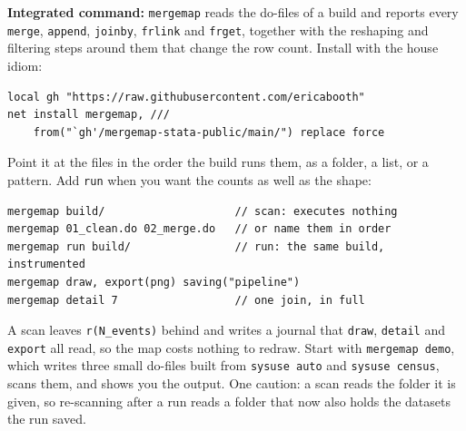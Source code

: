 \begin{kaobox}[frametitle=Package Integration: \texttt{mergemap}]
\textbf{Integrated command:} \texttt{mergemap} reads the do-files of a build and reports every \texttt{merge}, \texttt{append}, \texttt{joinby}, \texttt{frlink} and \texttt{frget}, together with the reshaping and filtering steps around them that change the row count. Install with the house idiom:
\par
{\footnotesize
\begin{verbatim}
local gh "https://raw.githubusercontent.com/ericabooth"
net install mergemap, ///
    from("`gh'/mergemap-stata-public/main/") replace force
\end{verbatim}
}
Point it at the files in the order the build runs them, as a folder, a list, or a pattern. Add \texttt{run} when you want the counts as well as the shape:
\par
{\footnotesize
\begin{verbatim}
mergemap build/                    // scan: executes nothing
mergemap 01_clean.do 02_merge.do   // or name them in order
mergemap run build/                // run: the same build, instrumented
mergemap draw, export(png) saving("pipeline")
mergemap detail 7                  // one join, in full
\end{verbatim}
}
A scan leaves \texttt{r(N\_events)} behind and writes a journal that \texttt{draw}, \texttt{detail} and \texttt{export} all read, so the map costs nothing to redraw. Start with \texttt{mergemap demo}, which writes three small do-files built from \texttt{sysuse auto} and \texttt{sysuse census}, scans them, and shows you the output. One caution: a scan reads the folder it is given, so re-scanning after a run reads a folder that now also holds the datasets the run saved.
\end{kaobox}

